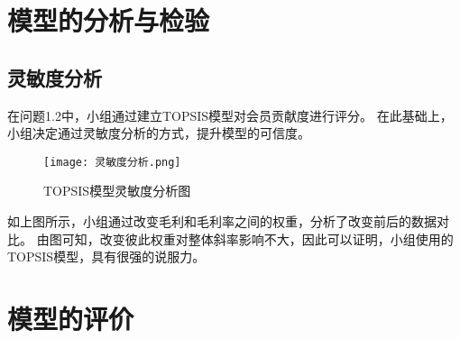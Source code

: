 \documentclass[withoutpreface,bwprint]{cumcmthesis}
\begin{document}








\section{模型的分析与检验}

\subsection{灵敏度分析}
\par
在问题1.2中，小组通过建立TOPSIS模型对会员贡献度进行评分。
在此基础上，小组决定通过灵敏度分析的方式，提升模型的可信度。
\begin{figure}[H]
\centering
\texttt{[image: 灵敏度分析.png]}
\caption{TOPSIS模型灵敏度分析图}
\label{fig:单图}
\end{figure}
如上图所示，小组通过改变毛利和毛利率之间的权重，分析了改变前后的数据对比。
由图可知，改变彼此权重对整体斜率影响不大，因此可以证明，小组使用的TOPSIS模型，具有很强的说服力。


\section{模型的评价}
\end{document}
